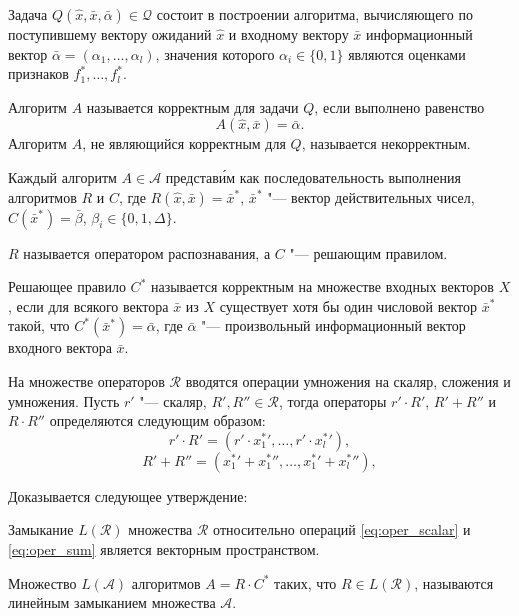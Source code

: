 Задача $Q(\hat{x},\bar{x},\bar\alpha)\in\mathcal Q$ состоит в построении алгоритма, вычисляющего по поступившему вектору ожиданий $\hat{x}$ и входному вектору $\bar{x}$ информационный вектор $\bar\alpha=(\alpha_1,\dots,\alpha_l)$, значения которого $\alpha_i\in\{0,1\}$ являются оценками  признаков $f_1^*,…,f_l^*$.

\begin{Def}
	Алгоритм $A$ называется корректным для задачи $Q$, если выполнено равенство
	$$
	A(\hat{x},\bar{x})=\bar{\alpha}.
	$$
	Алгоритм $A$, не являющийся корректным для $Q$, называется некорректным.
\end{Def}

\begin{Pred}\label{st:decompositon}
	Каждый алгоритм $A\in\mathcal A$ представ\'{и}м как последовательность выполнения алгоритмов $R$ и $C$, где $R(\hat{x},\bar{x})=\bar{x}^*$, $\bar{x}^*$ "--- вектор действительных чисел, $C(\bar{x}^*)=\bar{\beta}$, $\beta_i\in\{0,1,\Delta\}$.
\end{Pred}
$R$ называется оператором распознавания, а $C$ "--- решающим правилом.

\begin{Def}
	Решающее правило $C^*$ называется корректным на множестве входных векторов $X$, если для всякого вектора $\bar x$ из $X$ существует хотя бы один числовой вектор $\bar x^*$ такой, что $C^*(\bar{x}^*)=\bar{\alpha}$, где $\bar{\alpha}$ "--- произвольный информационный вектор входного вектора $\bar{x}$.
\end{Def}
На множестве операторов $\mathcal R$ вводятся операции умножения на скаляр, сложения и умножения. Пусть $r'$ "--- скаляр, $R',R''\in\mathcal R$, тогда операторы $r'{\cdot}R'$, $R'+R''$ и $R{\cdot}R''$ определяются следующим образом:
\begin{equation}
\label{eq:oper_scalar}
r'{\cdot}R'=(r'{\cdot}{x_1^*}',\dots,r'{\cdot}{x_l^*}'),
\end{equation}
\begin{equation}
\label{eq:oper_sum}
R'+R''=({x_1^*}'+{x_1^*}'',\dots,{x_1^*}'+{x_l^*}''),
\end{equation}

Доказывается следующее утверждение:
\begin{Pred}
	Замыкание $L(\mathcal R)$ множества $\mathcal R$ относительно операций \eqref{eq:oper_scalar} и \eqref{eq:oper_sum} является векторным пространством.
\end{Pred}
\begin{Def}
	Множество $L(\mathcal A)$ алгоритмов $A=R{\cdot}C^*$ таких, что $R{\in}L(\mathcal R)$, называются линейным замыканием множества $\mathcal A$.
\end{Def}

